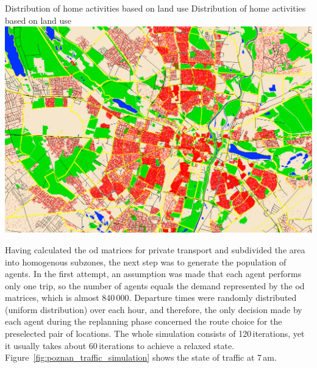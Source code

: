 \createfigure%
{Distribution of home activities based on land use}%
{Distribution of home activities based on land use}%
{\label{fig:poznan_home_distribution}}%
{\includegraphics[width=\textwidth, angle=0]{using/figures/poznan_home_distribution}}%
{}%

Having calculated the \gls{od} matrices for private transport and subdivided the area into homogenous subzones, the next step was to generate the population of agents. In the first attempt, an assumption was made that each agent performs only one trip, so the number of agents equals the demand represented by the \gls{od} matrices, which is almost 840\,000. Departure times were randomly distributed (uniform distribution) over each hour, and therefore, the only decision made by each agent during the replanning phase concerned the route choice for the preselected pair of locations. The whole simulation consists of 120\,iterations, yet it usually takes about 60\,iterations to achieve a relaxed state. Figure~\ref{fig:poznan_traffic_simulation} shows the state of traffic at 7\,am.


